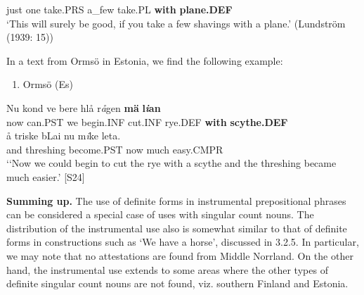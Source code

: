 just  one  take.PRS  a\_few  take.PL  \textbf{with} \textbf{plane.DEF}\\ %


‘This will surely be good, if you take a few shavings with a plane.’ (Lundström (1939: 15))
\z

In a text from Ormsö in Estonia, we find the following example:

\begin{enumerate} %
\item 
Ormsö (Es)

\end{enumerate} %
\ea\label{}
\gll Nu  kond  ve  bere  hlå  r\textit{å}gen  \textbf{mä} \textbf{l}\textbf{\textit{i}}\textbf{an}\\


now  can.PST  we  begin.INF  cut.INF  rye.DEF  \textbf{with} \textbf{scythe.DEF}\\ %


\ea\label{}
\gll å  triske  bLai  nu  m\textit{i}ke  leta.\\


and  threshing  become.PST  now  much   easy.CMPR\\ %


‘‘Now we could begin to cut the rye with a scythe and the threshing became much easier.’ [S24]
\z

\textbf{Summing up.} The use of definite forms in instrumental prepositional phrases can be considered a special case of uses with singular count nouns. The distribution of the instrumental use also is somewhat similar to that of definite forms in constructions such as ‘We have a horse’, discussed in 3.2.5. In particular, we may note that no attestations are found from Middle Norrland. On the other hand, the instrumental use extends to some areas where the other types of definite singular count nouns are not found, viz. southern Finland and Estonia. 

